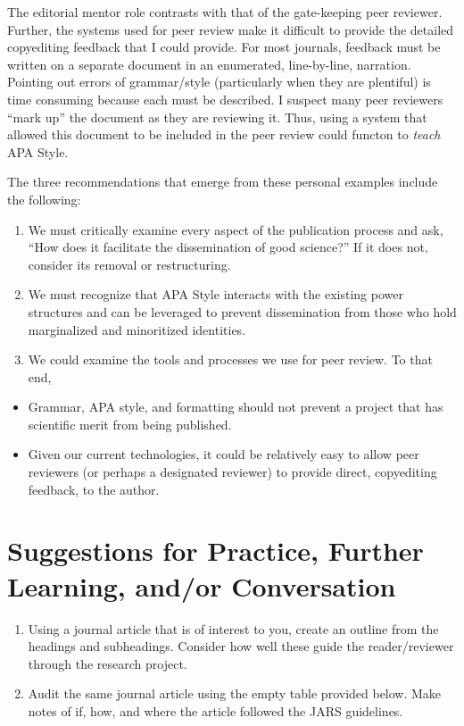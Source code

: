 \documentclass[
  11pt,
]{book}
\providecommand{\tightlist}{%
  \setlength{\itemsep}{0pt}\setlength{\parskip}{0pt}}
\begin{document}
The editorial mentor role contrasts with that of the gate-keeping peer reviewer. Further, the systems used for peer review make it difficult to provide the detailed copyediting feedback that I could provide. For most journals, feedback must be written on a separate document in an enumerated, line-by-line, narration. Pointing out errors of grammar/style (particularly when they are plentiful) is time consuming because each must be described. I suspect many peer reviewers ``mark up'' the document as they are reviewing it. Thus, using a system that allowed this document to be included in the peer review could functon to \emph{teach} APA Style.

The three recommendations that emerge from these personal examples include the following:

\begin{enumerate}
\def\labelenumi{\arabic{enumi}.}
\tightlist
\item
  We must critically examine every aspect of the publication process and ask, ``How does it facilitate the dissemination of good science?'' If it does not, consider its removal or restructuring.
\item
  We must recognize that APA Style interacts with the existing power structures and can be leveraged to prevent dissemination from those who hold marginalized and minoritized identities.
\item
  We could examine the tools and processes we use for peer review. To that end,
\end{enumerate}

\begin{itemize}
\tightlist
\item
  Grammar, APA style, and formatting should not prevent a project that has scientific merit from being published.
\item
  Given our current technologies, it could be relatively easy to allow peer reviewers (or perhaps a designated reviewer) to provide direct, copyediting feedback, to the author.
\end{itemize}

\section{Suggestions for Practice, Further Learning, and/or Conversation}\label{suggestions-for-practice-further-learning-andor-conversation-3}

\begin{enumerate}
\def\labelenumi{\arabic{enumi}.}
\tightlist
\item
  Using a journal article that is of interest to you, create an outline from the headings and subheadings. Consider how well these guide the reader/reviewer through the research project.
\item
  Audit the same journal article using the empty table provided below. Make notes of if, how, and where the article followed the JARS guidelines.
\end{enumerate}
\end{document}
